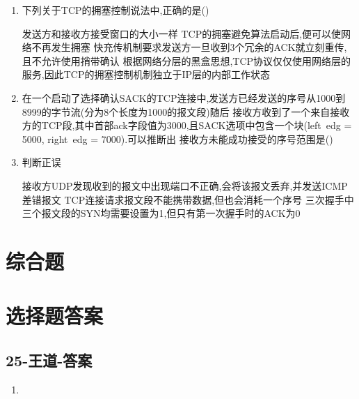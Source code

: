 \documentclass[12pt, a4paper, oneside, UTF8]{ctexbook}
\begin{document}
\begin{enumerate}
    \item 下列关于TCP的拥塞控制说法中,正确的是(\qquad)
    \begin{choices}[1]
        \task 发送方和接收方接受窗口的大小一样
        \task TCP的拥塞避免算法启动后,便可以使网络不再发生拥塞
        \task 快充传机制要求发送方一旦收到3个冗余的ACK就立刻重传,且不允许使用捎带确认
        \task 根据网络分层的黑盒思想,TCP协议仅仅使用网络层的服务,因此TCP的拥塞控制机制独立于IP层的内部工作状态
    \end{choices}

    \item 在一个启动了选择确认SACK的TCP连接中,发送方已经发送的序号从1000到8999的字节流(分为8个长度为1000的报文段)随后
    接收方收到了一个来自接收方的TCP段,其中首部ack字段值为3000,且SACK选项中包含一个块(left\ edg = 5000, right\ edg = 7000).可以推断出
    接收方未能成功接受的序号范围是(\qquad)

    \item 判断正误
    \begin{choices}[1]
        \task 接收方UDP发现收到的报文中出现端口不正确,会将该报文丢弃,并发送ICMP差错报文
        \task TCP连接请求报文段不能携带数据,但也会消耗一个序号
        \task 三次握手中三个报文段的SYN均需要设置为1,但只有第一次握手时的ACK为0
    \end{choices}

\end{enumerate}
\section{综合题}

\newpage

\section{选择题答案}
\subsection{25-王道-答案}
\begin{enumerate}
    \item 
\end{enumerate}
\end{document}
